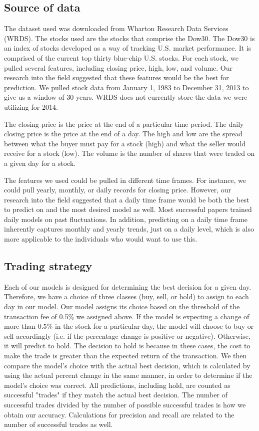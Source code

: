 \documentclass{article}
\begin{document}
\subsection{Source of data}
The dataset used was downloaded from Wharton Research Data Services (WRDS). The stocks used are the stocks that comprise the Dow30. The Dow30 is an index of stocks developed as a way of tracking U.S. market performance. It is comprised of the current top thirty blue-chip U.S. stocks. For each stock, we pulled several features, including closing price, high, low, and volume. Our research into the field suggested that these features would be the best for prediction. We pulled stock data from January 1, 1983 to December 31, 2013 to give us a window of 30 years. WRDS does not currently store the data we were utilizing for 2014.

The closing price is the price at the end of a particular time period. The daily closing price is the price at the end of a day. The high and low are the spread between what the buyer must pay for a stock (high) and what the seller would receive for a stock (low). The volume is the number of shares that were traded on a given day for a stock.

The features we used could be pulled in different time frames. For instance, we could pull yearly, monthly, or daily records for closing price. However, our research into the field suggested that a daily time frame would be both the best to predict on and the most desired model as well. Most successful papers trained daily models on past fluctuations. In addition, predicting on a daily time frame inherently captures monthly and yearly trends, just on a daily level, which is also more applicable to the individuals who would want to use this.

\subsection{Trading strategy}
Each of our models is designed for determining the best decision for a given day. Therefore, we have a choice of three classes (buy, sell, or hold) to assign to each day in our model. Our model assigns its choice based on the threshold of the transaction fee of 0.5\% we assigned above. If the model is expecting a change of more than 0.5\% in the stock for a particular day, the model will choose to buy or sell accordingly (i.e. if the percentage change is positive or negative). Otherwise, it will predict to hold. The decision to hold is because in these cases, the cost to make the trade is greater than the expected return of the transaction. We then compare the model's choice with the actual best decision, which is calculated by using the actual percent change in the same manner, in order to determine if the model's choice was correct. All predictions, including hold, are counted as successful "trades" if they match the actual best decision. The number of successful trades divided by the number of possible successful trades is how we obtain our accuracy. Calculations for precision and recall are related to the number of successful trades as well.
\end{document}
